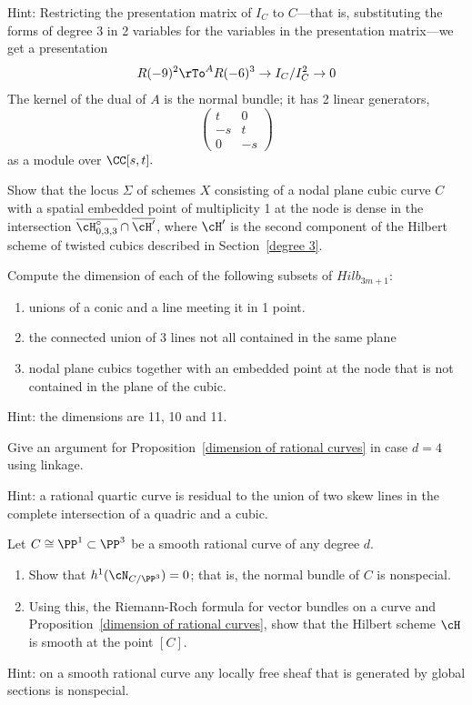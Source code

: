 Hint: Restricting the presentation matrix of $I_C$ to $C$---that is, substituting the forms of degree 3 in 2 variables for the variables in the presentation matrix---we get a presentation 
$$
R(-9)^2 \rTo^A R(-6)^3 \to I_C/I_C^2 \to 0 
$$
The kernel of the dual of $A$ is the normal bundle; it has 2 linear generators, 
$$
\begin{pmatrix}
t&0\\
-s&t\\
0&-s
\end{pmatrix}
$$
as a module over $\CC[s,t].$


\begin{exercise}\label{hilb intersection}
Show that the locus $\Sigma$ of schemes $X$ consisting of a nodal plane cubic curve $C$ with a spatial embedded point of multiplicity 1 at the node is dense in the intersection $\overline{\cH^\circ_{0,3,3}} \cap \overline{\cH'}$, where $\cH'$ is the second component of the Hilbert scheme of twisted cubics described in Section~\ref{degree 3}.
\end{exercise}

\begin{exercise}
 Compute the dimension of each of the following subsets of $Hilb_{3m+1}$:
 
\begin{enumerate}
 \item unions of a conic and a line meeting it in 1 point.
 \item the connected union of 3 lines not all contained in the same plane
 \item nodal plane cubics together with an embedded point at the node that is not contained in the plane of
 the cubic.
\end{enumerate}

Hint: the dimensions are 11, 10 and 11.
\end{exercise}

\begin{exercise}
Give an argument for Proposition~\ref{dimension of rational curves} in case $d=4$ using linkage. 

Hint: a rational quartic curve is residual to the union of two skew lines in the complete intersection of a quadric and a cubic.
\end{exercise}

\begin{exercise}
Let $C \cong \PP^1 \subset \PP^3$ be a smooth rational curve of any degree $d$. 
\begin{enumerate}
\item Show that $h^1(\cN_{C/\PP^3}) = 0$; that is, the normal bundle of $C$ is nonspecial.
\item Using this, the Riemann-Roch formula for vector bundles on a curve and Proposition~\ref{dimension of rational curves}, show that the Hilbert scheme $\cH$ is smooth at the point $[C]$.
\end{enumerate} 

Hint: on a smooth rational curve any locally free sheaf that is generated by global sections is nonspecial.
\end{exercise}

